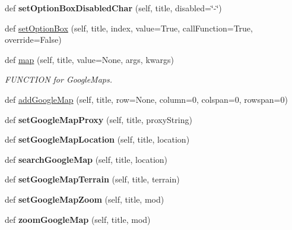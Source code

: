\begin{DoxyCompactItemize}
\mbox{\label{classappjar_1_1gui_a8f5a026206ff13ae969d2e60522180b2}} 
def {\bfseries set\+Option\+Box\+Disabled\+Char} (self, title, disabled=\char`\"{}-\/\char`\"{})
\item 
def \hyperlink{classappjar_1_1gui_a1265f35528c0da179bf0ef8568fdf463}{set\+Option\+Box} (self, title, index, value=True, call\+Function=True, override=False)
\item 
def \hyperlink{classappjar_1_1gui_ab4d56afa73b7e76d44a8b04a4c2ea1f2}{map} (self, title, value=None, args, kwargs)
\begin{DoxyCompactList}\small\item\em F\+U\+N\+C\+T\+I\+ON for Google\+Maps. \end{DoxyCompactList}\item 
def \hyperlink{classappjar_1_1gui_a2441a7d64981fd4552d1530661f53547}{add\+Google\+Map} (self, title, row=None, column=0, colspan=0, rowspan=0)
\item 
\mbox{\label{classappjar_1_1gui_aeafeaaad980931f348948bad35c3719e}} 
def {\bfseries set\+Google\+Map\+Proxy} (self, title, proxy\+String)
\item 
\mbox{\label{classappjar_1_1gui_a1638b2573ea2abc2b94afa7679e95330}} 
def {\bfseries set\+Google\+Map\+Location} (self, title, location)
\item 
\mbox{\label{classappjar_1_1gui_a2bc9277a26e23c69ab33a3073e315aea}} 
def {\bfseries search\+Google\+Map} (self, title, location)
\item 
\mbox{\label{classappjar_1_1gui_ab5b8f77393852cb98096fddd3bc7bd59}} 
def {\bfseries set\+Google\+Map\+Terrain} (self, title, terrain)
\item 
\mbox{\label{classappjar_1_1gui_ae0fd1d275df3545f961aa96b8d159fac}} 
def {\bfseries set\+Google\+Map\+Zoom} (self, title, mod)
\item 
\mbox{\label{classappjar_1_1gui_a661a2afbc614939a6a44fe9c61d7f1ab}} 
def {\bfseries zoom\+Google\+Map} (self, title, mod)
\item 
\mbox{\label{classappjar_1_1gui_a814bdde7ea0a358f20347adb61d4cd02}} 

\end{DoxyCompactItemize}
